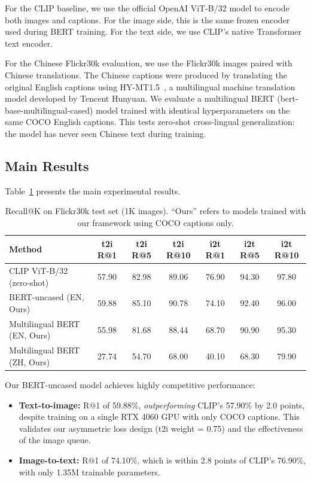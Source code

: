 \documentclass[10pt,leqno]{amsart}
\begin{document}
For the CLIP baseline, we use the official OpenAI ViT-B/32 model to encode both images and captions. For the image side, this is the same frozen encoder used during BERT training. For the text side, we use CLIP's native Transformer text encoder.

For the Chinese Flickr30k evaluation, we use the Flickr30k images paired with Chinese translations. The Chinese captions were produced by translating the original English captions using HY-MT1.5~\citep{hymt152025tencent}, a multilingual machine translation model developed by Tencent Hunyuan. We evaluate a multilingual BERT (bert-base-multilingual-cased) model trained with identical hyperparameters on the same COCO English captions. This tests zero-shot cross-lingual generalization: the model has never seen Chinese text during training.

\subsection{Main Results}

Table~\ref{tab:results} presents the main experimental results.

\begin{table}[h]
\centering
\caption{Recall@K on Flickr30k test set (1K images). ``Ours'' refers to models trained with our framework using COCO captions only.}
\label{tab:results}
\begin{tabular}{lcccccc}
\toprule
Method & t2i R@1 & t2i R@5 & t2i R@10 & i2t R@1 & i2t R@5 & i2t R@10 \\
\midrule
CLIP ViT-B/32 (zero-shot) & 57.90 & 82.98 & 89.06 & 76.90 & 94.30 & 97.80 \\
BERT-uncased (EN, Ours)   & 59.88 & 85.10 & 90.78 & 74.10 & 92.40 & 96.00 \\
\midrule
Multilingual BERT (EN, Ours) & 55.98 & 81.68 & 88.44 & 68.70 & 90.90 & 95.30 \\
Multilingual BERT (ZH, Ours) & 27.74 & 54.70 & 68.00 & 40.10 & 68.30 & 79.90 \\
\bottomrule
\end{tabular}
\end{table}

Our BERT-uncased model achieves highly competitive performance:
\begin{itemize}
    \item \textbf{Text-to-image:} R@1 of 59.88\%, \emph{outperforming} CLIP's 57.90\% by 2.0 points, despite training on a single RTX 4060 GPU with only COCO captions. This validates our asymmetric loss design (t2i weight = 0.75) and the effectiveness of the image queue.
    \item \textbf{Image-to-text:} R@1 of 74.10\%, which is within 2.8 points of CLIP's 76.90\%, with only 1.35M trainable parameters.
\end{itemize}
\end{document}
